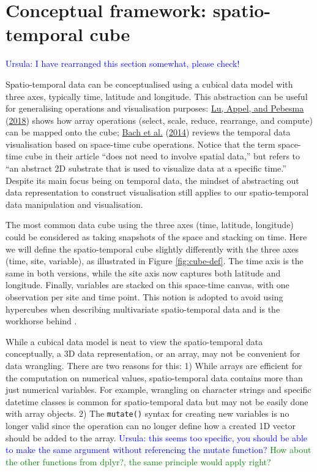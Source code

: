\documentclass{article}
\begin{document}
\hypertarget{cube}{%
\section{Conceptual framework: spatio-temporal cube}\label{cube}}

\textcolor{blue}{Ursula: I have rearranged this section somewhat, please check!}

Spatio-temporal data can be conceptualised using a cubical data model with three axes, typically time, latitude and longitude. This abstraction can be useful for generalising operations and visualisation purposes: \protect\hyperlink{ref-lu_multidimensional_2018}{Lu, Appel, and Pebesma} (\protect\hyperlink{ref-lu_multidimensional_2018}{2018}) shows how array operations (select, scale, reduce, rearrange, and compute) can be mapped onto the cube; \protect\hyperlink{ref-bach_review_2014}{Bach et al.} (\protect\hyperlink{ref-bach_review_2014}{2014}) reviews the temporal data visualisation based on space-time cube operations. Notice that the term space-time cube in their article ``does not need to involve spatial data,'' but refers to ``an abstract 2D substrate that is used to visualize data at a specific time.'' Despite its main focus being on temporal data, the mindset of abstracting out data representation to construct visualisation still applies to our spatio-temporal data manipulation and visualisation.

The most common data cube using the three axes (time, latitude, longitude) could be considered as taking snapshots of the space and stacking on time. Here we will define the spatio-temporal cube slightly differently with the three axes (time, site, variable), as illustrated in Figure \ref{fig:cube-def}. The time axis is the same in both versions, while the site axis now captures both latitude and longitude. Finally, variables are stacked on this space-time canvas, with one observation per site and time point. This notion is adopted to avoid using hypercubes when describing multivariate spatio-temporal data and is the workhorse behind .

While a cubical data model is neat to view the spatio-temporal data conceptually, a 3D data representation, or an array, may not be convenient for data wrangling. There are two reasons for this: 1) While arrays are efficient for the computation on numerical values, spatio-temporal data contains more than just numerical variables. For example, wrangling on character strings and specific datetime classes is common for spatio-temporal data but may not be easily done with array objects. 2) The \texttt{mutate()} syntax for creating new variables is no longer valid since the operation can no longer define how a created 1D vector should be added to the array.
\textcolor{blue}{Ursula: this seems too specific, you should be able to make the same argument without referencing the mutate function?}
\textcolor{green}{How about the other functions from dplyr?, the same principle would apply right?}
\end{document}
